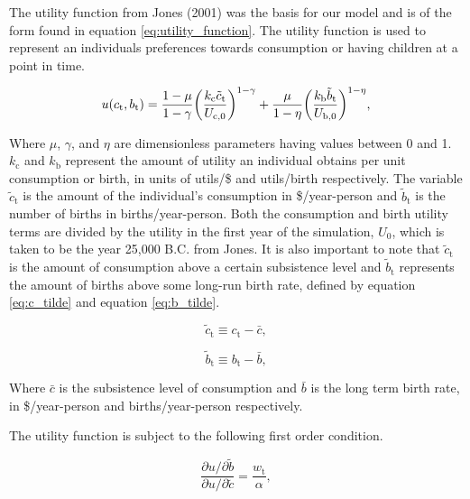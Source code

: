 \documentclass[letterpaper,12pt]{article}
\begin{document}
The utility function from Jones (2001) was the basis for our model and is of the form found in equation \ref{eq:utility_function}. The utility function is used to represent an individuals preferences towards consumption or having children at a point in time. 

\begin{equation} \label{eq:utility_function}
u(c_\mathrm{t}, b_\mathrm{t}) = \frac{1-\mu}{1-\gamma} \bigg{(}\frac{k_\mathrm{c} \tilde c_\mathrm{t}}{U_\mathrm{c,0}} \bigg{)}^{1-\gamma} + \frac{\mu}{1-\eta} \bigg{(}\frac{k_\mathrm{b} \tilde b_\mathrm{t}}{U_\mathrm{b,0}} \bigg{)}^{1-\eta},
\end{equation}

Where $\mu$, $\gamma$, and $\eta$ are dimensionless parameters having values between 0 and 1. $k_\mathrm{c}$ and $k_\mathrm{b}$ represent the amount of utility an individual obtains per unit consumption or birth, in units of utils/\$ and utils/birth respectively. The variable $\tilde c_\mathrm{t}$ is the amount of the individual's consumption in \$/year-person and $\tilde b_\mathrm{t}$ is the number of births in births/year-person. Both the consumption and birth utility terms are divided by the utility in the first year of the simulation, $U_\mathrm{0}$, which is taken to be the year 25,000 B.C. from Jones. It is also important to note that $\tilde c_\mathrm{t}$ is the amount of consumption above a certain subsistence level and $\tilde b_\mathrm{t}$ represents the amount of births above some long-run birth rate, defined by equation \ref{eq:c_tilde} and equation \ref{eq:b_tilde}.

\begin{equation} \label{eq:c_tilde}
\tilde c_\mathrm{t} \equiv c_\mathrm{t} - \bar c,
\end{equation}

\begin{equation} \label{eq:b_tilde}
\tilde b_\mathrm{t} \equiv b_\mathrm{t} - \bar b,
\end{equation}

Where $\bar c$ is the subsistence level of consumption and $\bar b$ is the long term birth rate, in \$/year-person and births/year-person respectively.

The utility function is subject to the following first order condition.

\begin{equation} \label{eq:first_order_condition}
\frac{\partial u/ \partial\tilde b}{\partial u/ \partial\tilde c} = \frac{w_\mathrm{t}}{\alpha},
\end{equation}
\end{document}
